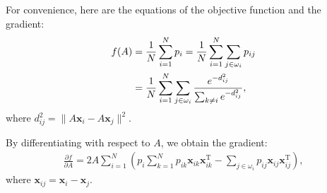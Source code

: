 \documentclass[12pt]{article}
\begin{document}
For convenience, here are the equations of the objective function and the gradient:
\begin{align}
 f(A) &= \frac{1}{N}\sum_{i=1}^Np_i=\frac{1}{N}\sum_{i=1}^N\sum_{j\in\omega_i}p_{ij}\notag\\
 &= \frac{1}{N}\sum_{i=1}^N\sum_{j\in\omega_i}\frac{e^{-d_{ij}^2}}{\sum_{k\neq i}e^{-d_{ij}^2}}\label{eq:nca-2},
\end{align}
 where $d_{ij}^2=\lVert A\mathbf{x}_i-A\mathbf{x}_j\lVert^2$.

By differentiating with respect to $A$, we obtain the gradient:
\begin{align}
  \frac{\partial f}{\partial A}=2A\sum_{i=1}^{N}\left(p_i\sum_{k=1}^Np_{ik}\mathbf{x}_{ik}\mathbf{x}_{ik}^{\textrm{T}} - \sum_{j\in\omega_i}p_{ij}\mathbf{x}_{ij}\mathbf{x}_{ij}^{\textrm{T}} \right)\label{eq:nca-grad},
\end{align}
where $\mathbf{x}_{ij} = \mathbf{x}_i - \mathbf{x}_j$.
\end{document}
